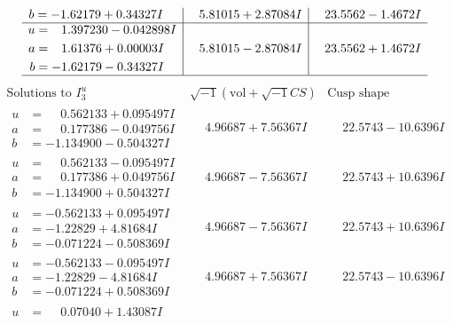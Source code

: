 \documentclass[1p]{elsarticle_modified}
\theoremstyle{definition}
\newcommand{\I}{\sqrt{-1}}
\begin{document}
$$\begin{array}{c|c|c}
\begin{aligned}
b &= -1.62179 + 0.34327 I\end{aligned}
 & \phantom{-}5.81015 + 2.87084 I & \phantom{-}23.5562 - 1.4672 I \\ \hline\begin{aligned}
u &= \phantom{-}1.397230 - 0.042898 I \\
a &= \phantom{-}1.61376 + 0.00003 I \\
b &= -1.62179 - 0.34327 I\end{aligned}
 & \phantom{-}5.81015 - 2.87084 I & \phantom{-}23.5562 + 1.4672 I\\
 \hline 
 \end{array}$$\newpage$$\begin{array}{c|c|c}  
\text{Solutions to }I^u_{3}& \I (\text{vol} + \sqrt{-1}CS) & \text{Cusp shape}\\
 \hline 
\begin{aligned}
u &= \phantom{-}0.562133 + 0.095497 I \\
a &= \phantom{-}0.177386 - 0.049756 I \\
b &= -1.134900 - 0.504327 I\end{aligned}
 & \phantom{-}4.96687 + 7.56367 I & \phantom{-}22.5743 - 10.6396 I \\ \hline\begin{aligned}
u &= \phantom{-}0.562133 - 0.095497 I \\
a &= \phantom{-}0.177386 + 0.049756 I \\
b &= -1.134900 + 0.504327 I\end{aligned}
 & \phantom{-}4.96687 - 7.56367 I & \phantom{-}22.5743 + 10.6396 I \\ \hline\begin{aligned}
u &= -0.562133 + 0.095497 I \\
a &= -1.22829 + 4.81684 I \\
b &= -0.071224 - 0.508369 I\end{aligned}
 & \phantom{-}4.96687 - 7.56367 I & \phantom{-}22.5743 + 10.6396 I \\ \hline\begin{aligned}
u &= -0.562133 - 0.095497 I \\
a &= -1.22829 - 4.81684 I \\
b &= -0.071224 + 0.508369 I\end{aligned}
 & \phantom{-}4.96687 + 7.56367 I & \phantom{-}22.5743 - 10.6396 I \\ \hline\begin{aligned}
u &= \phantom{-}0.07040 + 1.43087 I \\

\end{aligned}
\end{array}$$
\end{document}
